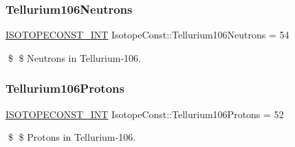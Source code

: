 \subsubsection{\texorpdfstring{Tellurium106\+Neutrons}{Tellurium106Neutrons}}
{\footnotesize\ttfamily \mbox{\hyperlink{group___isotope_const-_macros_ga5f18360b3e99483a35c32d789e62621c}{I\+S\+O\+T\+O\+P\+E\+C\+O\+N\+S\+T\+\_\+\+I\+NT}} Isotope\+Const\+::\+Tellurium106\+Neutrons = 54}

\$ \$ Neutrons in Tellurium-\/106. \mbox{\label{group___isotope_const-_tellurium-_te106_gac56c59e9ccc4700f73ad10e5878fe7df}} 
\subsubsection{\texorpdfstring{Tellurium106\+Protons}{Tellurium106Protons}}
{\footnotesize\ttfamily \mbox{\hyperlink{group___isotope_const-_macros_ga5f18360b3e99483a35c32d789e62621c}{I\+S\+O\+T\+O\+P\+E\+C\+O\+N\+S\+T\+\_\+\+I\+NT}} Isotope\+Const\+::\+Tellurium106\+Protons = 52}

\$ \$ Protons in Tellurium-\/106. 